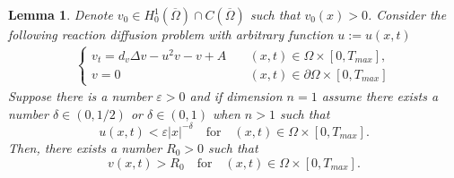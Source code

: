\documentclass[12pt, a4paper]{article}
\theoremstyle{break}
\theoremstyle{break}
\theoremstyle{break}
\theoremstyle{break}
\theoremstyle{break}
\newtheorem{lem}{Lemma}[section]
\theoremstyle{break}
\theoremstyle{break}
\begin{document}
\begin{lem}
    Denote $v_0 \in H^1_0(\overline{\Omega}) \cap C(\overline{\Omega})$ such that $v_0(x) > 0$. Consider the following reaction diffusion problem with arbitrary function $u := u(x,t)$
    \begin{align}
        \label{EQ:PDE_FOR_V}
        \begin{cases}
            v_t = d_v \Delta v - u^2 v - v + A &\quad (x, t) \in \Omega \times [0, T_{max}], \\
            v = 0 &\quad (x, t) \in \partial\Omega \times[0, T_{max}]
        \end{cases}
    \end{align}
    Suppose there is a number $\varepsilon > 0$ and if dimension $n=1$ assume there exists a number $\delta \in (0, 1/2)$ or $\delta \in (0,1)$ when $n > 1$ such that
    \begin{equation}
        \label{EQ:AprioriUpperBound_U}
        u(x,t) < \varepsilon |x|^{-\delta} \quad \text{for} \quad (x, t) \in \Omega \times [0, T_{max}].
    \end{equation}
    Then, there exists a number $R_0 > 0$ such that
    \begin{equation}
        \label{EQ:Strict-Nonnegativity-V}
        v(x,t) > R_0 \quad \text{for} \quad (x, t) \in \Omega \times [0, T_{max}].
    \end{equation}
\end{lem}
\end{document}
